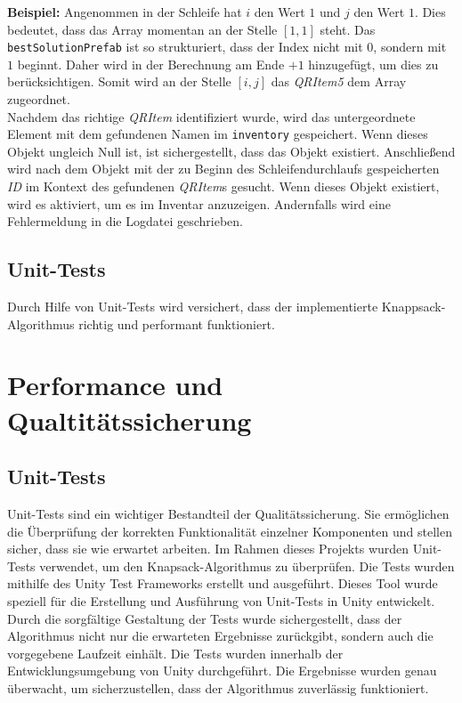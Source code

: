 \textbf{Beispiel:}
Angenommen in der Schleife hat $i$ den Wert $1$ und $j$ den Wert $1$. Dies bedeutet, dass das Array momentan an der Stelle $[1, 1]$
steht. Das \texttt{bestSolutionPrefab} ist so strukturiert, dass der Index nicht mit $0$, sondern mit $1$ beginnt. Daher
wird in der Berechnung am Ende $+ 1$ hinzugefügt, um dies zu berücksichtigen. Somit wird an der Stelle $[i, j]$ das
\textit{QRItem5} dem Array zugeordnet.\\

Nachdem das richtige \textit{QRItem} identifiziert wurde, wird das untergeordnete Element mit dem gefundenen Namen im
\texttt{inventory} gespeichert. Wenn dieses Objekt ungleich Null ist, ist sichergestellt, dass das Objekt existiert.
Anschließend wird nach dem Objekt mit der zu Beginn des Schleifendurchlaufs gespeicherten \textit{ID} im Kontext des
gefundenen \textit{QRItem}s gesucht. Wenn dieses Objekt existiert, wird es aktiviert, um es im Inventar anzuzeigen.
Andernfalls wird eine Fehlermeldung in die Logdatei geschrieben.

\subsection{Unit-Tests}
Durch Hilfe von Unit-Tests wird versichert, dass der implementierte Knappsack-Algorithmus
richtig und performant funktioniert.

\section{Performance und Qualtitätssicherung}
\subsection{Unit-Tests}
Unit-Tests sind ein wichtiger Bestandteil der Qualitätssicherung. Sie ermöglichen die Überprüfung der korrekten
Funktionalität einzelner Komponenten und stellen sicher, dass sie wie erwartet arbeiten. Im Rahmen dieses Projekts wurden
Unit-Tests verwendet, um den Knapsack-Algorithmus zu überprüfen.  Die Tests wurden mithilfe des Unity Test Frameworks
erstellt und ausgeführt. Dieses Tool wurde speziell für die Erstellung und Ausführung von Unit-Tests in Unity entwickelt.
Durch die sorgfältige Gestaltung der Tests wurde sichergestellt, dass der Algorithmus nicht nur die erwarteten Ergebnisse
zurückgibt, sondern auch die vorgegebene Laufzeit einhält. Die Tests wurden innerhalb der Entwicklungsumgebung von Unity
durchgeführt. Die Ergebnisse wurden genau überwacht, um sicherzustellen, dass der Algorithmus zuverlässig funktioniert.


